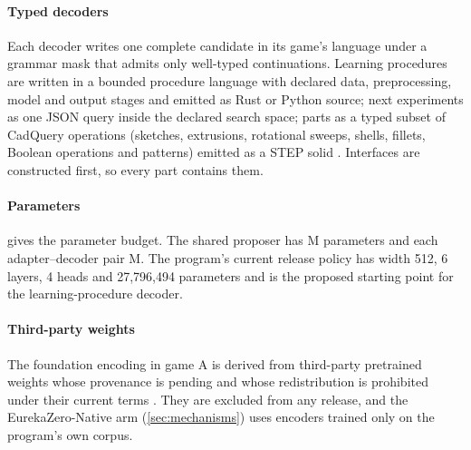 \paragraph{Typed decoders} Each decoder writes one complete candidate in its game's language under a
grammar mask that admits only well-typed continuations. Learning procedures are written in a bounded
procedure language with declared data, preprocessing, model and output stages and emitted as Rust or
Python source; next experiments as one JSON query inside the declared search space; parts as a typed
subset of CadQuery operations (sketches, extrusions, rotational sweeps, shells, fillets, Boolean
operations and patterns) emitted as a STEP solid \citep{cadquery2024}. Interfaces are constructed
first, so every part contains them.

\paragraph{Parameters}  gives the parameter budget. The shared proposer has
\syn[EZ-G21]{\EZparamShared}M parameters and each adapter--decoder pair
\syn[EZ-G21]{\EZparamAdapters}M. The program's current release policy has width 512, 6 layers, 4 heads
and 27,796,494 parameters \est{} and is the proposed starting point for the learning-procedure decoder.

\paragraph{Third-party weights} The foundation encoding in game A is derived from third-party
pretrained weights whose provenance is pending and whose redistribution is prohibited under their
current terms \est{}. They are excluded from any release, and the EurekaZero-Native arm
(\cref{sec:mechanisms}) uses encoders trained only on the program's own corpus.
